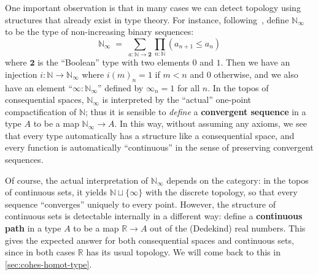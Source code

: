 \documentclass[12pt]{article}
\def\oo{\ensuremath{\infty}}
\def\N{\mathbb{N}}
\def\R{\mathbb{R}}
\def\T{\mathcal{T}}
\def\bool{\mathbf{2}}
\def\unit{\mathbf{1}}
\numberwithin{equation}{section}
\begin{document}
One important observation is that in many cases we can {detect} topology using structures that already exist in type theory.
For instance, following~\cite{es:universe-indiscrete}, define $\N_\oo$ to be the type of non-increasing binary sequences:
\[ \N_\oo \;=\; \textstyle\sum_{a:\N\to \bool} \prod_{n:\N} (a_{n+1} \le a_n) \]
where $\bool$ is the ``Boolean'' type with two elements $0$ and $1$.
Then we have an injection $i:\N\to\N_\oo$ where $i(m)_n = 1$ if $m<n$ and $0$ otherwise, and we also have an element ``$\oo:\N_\oo$'' defined by $\oo_n = 1$ for all $n$.
In the topos of consequential spaces, $\N_\oo$ is interpreted by the ``actual'' one-point compactification of $\N$; thus it is sensible to \emph{define} a \textbf{convergent sequence} in a type $A$ to be a map $\N_\oo \to A$.
In this way, without assuming any axioms, we see that every type {automatically} has a structure like a consequential space, and every function is {automatically} ``continuous'' in the sense of preserving convergent sequences.

Of course, the actual interpretation of $\N_\oo$ depends on the category: in the topos of continuous sets, it yields $\N\sqcup\{\oo\}$ with the discrete topology, so that every sequence ``converges'' uniquely to every point.
However, the structure of continuous sets is detectable internally in a different way: define a \textbf{continuous path} in a type $A$ to be a map $\R \to A$ out of the (Dedekind) real numbers.
This gives the expected answer for both consequential spaces and continuous sets, since in both cases $\R$ has its usual topology.
We will come back to this in \cref{sec:cohes-homot-type}.
\end{document}

